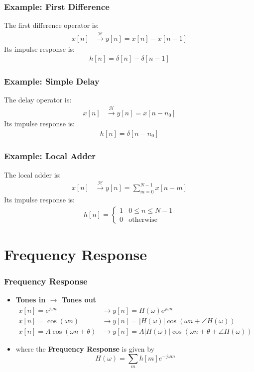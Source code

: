 \documentclass{beamer}
\begin{document}
\begin{frame}
  \frametitle{Example: First Difference}

  The first difference operator is:
  \begin{align*}
  x[n] &\stackrel{\mathcal H}{\longrightarrow} y[n]=x[n]-x[n-1]
  \end{align*}
  Its impulse response is:
  \begin{align*}
    h[n] = \delta[n]-\delta[n-1]
  \end{align*}
\end{frame}
  
\begin{frame}
  \frametitle{Example: Simple Delay}

  The delay operator is:
  \begin{align*}
  x[n] &\stackrel{\mathcal H}{\longrightarrow} y[n]=x[n-n_0]
  \end{align*}
  Its impulse response is:
  \begin{align*}
    h[n] = \delta[n-n_0]
  \end{align*}
\end{frame}
  
\begin{frame}
  \frametitle{Example: Local Adder}

  The local adder is:
  \begin{align*}
  x[n] &\stackrel{\mathcal H}{\longrightarrow} y[n]=\sum_{m=0}^{N-1} x[n-m]
  \end{align*}
  Its impulse response is:
  \begin{align*}
    h[n] = \begin{cases}1 & 0\le n\le N-1\\0&\mbox{otherwise}\end{cases}
  \end{align*}
\end{frame}


\section[Freq.~Response]{Frequency Response}
\setcounter{subsection}{1}


\begin{frame}
  \frametitle{Frequency Response}
  \begin{itemize}
  \item {\bf Tones in $\rightarrow$ Tones out}
    \begin{align*}
      x[n]=e^{j\omega n} &\rightarrow y[n]=H(\omega)e^{j\omega n}\\
      x[n]=\cos\left(\omega n\right)
      &\rightarrow y[n]=|H(\omega)|\cos\left(\omega n+\angle H(\omega)\right)\\
      x[n]=A\cos\left(\omega n+\theta\right)
      &\rightarrow y[n]=A|H(\omega)|\cos\left(\omega n+\theta+\angle H(\omega)\right)
    \end{align*}
  \item where the {\bf Frequency Response} is given by
    \[
    H(\omega) = \sum_m h[m]e^{-j\omega m}
    \]
  \end{itemize}
\end{frame}  
        
\end{document}
